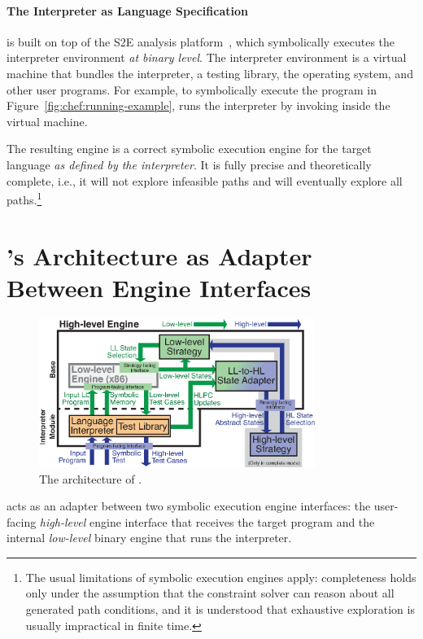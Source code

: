 \paragraph{The Interpreter as Language Specification}

\chef is built on top of the S2E analysis platform~\cite{s2eSystem}, which symbolically executes the interpreter environment \emph{at binary level}.
%
The interpreter environment is a virtual machine that bundles the interpreter, a testing library, the operating system, and other user programs.
%
For example, to symbolically execute the program in Figure~\ref{fig:chef:running-example},  \chef runs the interpreter by invoking  inside the virtual machine.

The resulting engine is a correct symbolic execution engine for the target language \emph{as defined by the interpreter}.
%
It is fully precise and theoretically complete, i.e., it will not explore infeasible paths and will eventually explore all paths.\footnote{The usual limitations of symbolic execution engines apply: completeness holds only under the assumption that the constraint solver can reason about all generated path conditions, and it is understood that exhaustive exploration is usually impractical in finite time.}


\section{\chef's Architecture as Adapter Between Engine Interfaces}

\begin{figure}
  \centering
  \includegraphics[width=0.8\textwidth]{figures/chef/iface-adapter}
  \caption{The architecture of \chef.}
  \label{fig:chef:arch}
\end{figure}

\chef acts as an adapter between two symbolic execution engine interfaces:
%
the user-facing \emph{high-level} engine interface that receives the target program and the internal \emph{low-level} binary engine that runs the interpreter.

